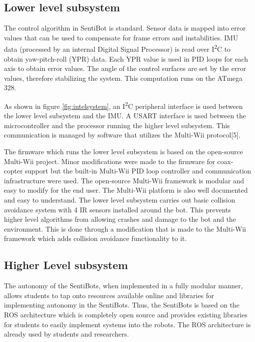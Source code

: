 \documentclass[12pt]{article}
\begin{document}
\subsection{Lower level subsystem}

The control algorithm in SentiBot is standard. Sensor data is mapped into error values that can be used to compensate for frame errors and instabilities. IMU data (processed by an internal Digital Signal Processor) is read over I\textsuperscript{2}C to obtain yaw-pitch-roll (YPR) data. Each YPR value is used in PID loops for each axis to obtain error values. The angle of the control surfaces are set by the error values, therefore stabilizing the system. This computation runs on the ATmega 328.

As shown in figure \ref{fig:intelsystem}, an I\textsuperscript{2}C peripheral interface is used between the lower level subsystem and the IMU. A USART interface is used between the microcontroller and the processor running the higher level subsystem. This communication is managed by software that utilizes the Multi-Wii protocol[5].

The firmware which runs the lower level subsystem is based on the open-source Multi-Wii project. Minor modifications were made to the firmware for coax-copter support but the built-in Multi-Wii PID loop controller and communication infrastructure were used. The open-source Multi-Wii framework is modular and easy to modify for the end user. The Multi-Wii platform is also well documented and easy to understand. The lower level subsystem carries out basic collision avoidance system with 4 IR sensors installed around the bot. This prevents higher level algorithms from allowing crashes and damage to the bot and the environment. This is done through a modification that is made to the Multi-Wii framework which adds collision avoidance functionality to it.

\subsection{Higher Level subsystem}

The autonomy of the SentiBots, when implemented in a fully modular manner, allows students to tap onto resources available online and libraries for implementing autonomy in the SentiBots. Thus, the SentiBots is based on the ROS architecture which is completely open source and provides existing libraries for students to easily implement systems into the robots. The ROS architecture is already used by students and researchers.
\end{document}
